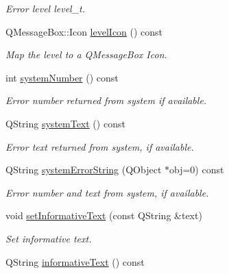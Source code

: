 \begin{DoxyCompactItemize}
\begin{DoxyCompactList}\small\item\em Error level  level\_\-t. \end{DoxyCompactList}\item 
\hypertarget{classmdt_error_aac5a7cec9a5d4364f9331c80e1eafe99}{
QMessageBox::Icon \hyperlink{classmdt_error_aac5a7cec9a5d4364f9331c80e1eafe99}{levelIcon} () const }
\label{classmdt_error_aac5a7cec9a5d4364f9331c80e1eafe99}

\begin{DoxyCompactList}\small\item\em Map the level to a QMessageBox Icon. \end{DoxyCompactList}\item 
\hypertarget{classmdt_error_a1be3f45cd56b3142f50c288df9f53204}{
int \hyperlink{classmdt_error_a1be3f45cd56b3142f50c288df9f53204}{systemNumber} () const }
\label{classmdt_error_a1be3f45cd56b3142f50c288df9f53204}

\begin{DoxyCompactList}\small\item\em Error number returned from system if available. \end{DoxyCompactList}\item 
\hypertarget{classmdt_error_a6cd449e657f321b86d234269b5e92cda}{
QString \hyperlink{classmdt_error_a6cd449e657f321b86d234269b5e92cda}{systemText} () const }
\label{classmdt_error_a6cd449e657f321b86d234269b5e92cda}

\begin{DoxyCompactList}\small\item\em Error text returned from system, if available. \end{DoxyCompactList}\item 
QString \hyperlink{classmdt_error_a28d22c0b9341faacfef22a7deae2da3c}{systemErrorString} (QObject $\ast$obj=0) const 
\begin{DoxyCompactList}\small\item\em Error number and text from system, if available. \end{DoxyCompactList}\item 
\hypertarget{classmdt_error_a8ef108a0502df7875f1b54bbb2a8919d}{
void \hyperlink{classmdt_error_a8ef108a0502df7875f1b54bbb2a8919d}{setInformativeText} (const QString \&text)}
\label{classmdt_error_a8ef108a0502df7875f1b54bbb2a8919d}

\begin{DoxyCompactList}\small\item\em Set informative text. \end{DoxyCompactList}\item 
\hypertarget{classmdt_error_adcc1905f585c327cec8a2e31af616651}{
QString \hyperlink{classmdt_error_adcc1905f585c327cec8a2e31af616651}{informativeText} () const }
\label{classmdt_error_adcc1905f585c327cec8a2e31af616651}


\end{DoxyCompactItemize}
